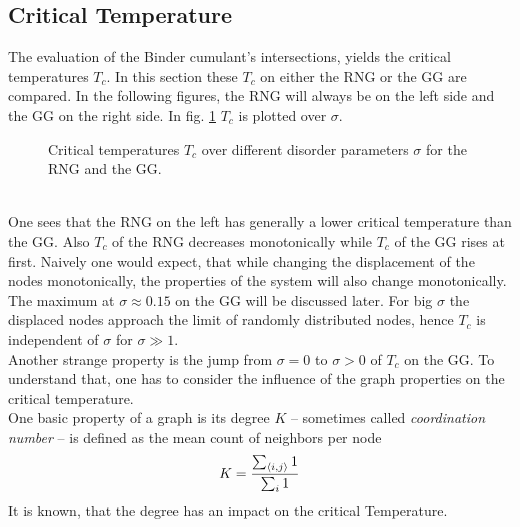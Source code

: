 \subsection{Critical Temperature}
\label{ssec:binderIntersections}
    The evaluation of the Binder cumulant's intersections, yields the
    critical temperatures \(T_c\).
    In this section these \(T_c\) on either the RNG or the GG are
    compared. In the following figures, the RNG will always be on the
    left side and the GG on the right side.
    In fig. \ref{fig:Tc} \(T_c\) is plotted over \(\sigma\).
    \begin{figure}[htbp]
        \centering
        \caption[Critical Temperature over different disorder parameters]
        {
            Critical temperatures \(T_c\) over different
            disorder parameters \(\sigma\) for
             the RNG and
             the GG.\\
        }
        \label{fig:Tc}
    \end{figure}\\
    One sees that the RNG on the left has generally a lower critical
    temperature than the GG. Also \(T_c\) of the RNG decreases
    monotonically while \(T_c\) of the GG rises at first. Naively one would
    expect, that while changing the displacement of the nodes monotonically,
    the properties of the system will also change monotonically. The
    maximum at \(\sigma \approx 0.15\) on the GG will be discussed later.
    For big \(\sigma\) the displaced nodes approach the limit of randomly
    distributed nodes, hence \(T_c\) is independent of \(\sigma\) for
    \(\sigma \gg 1\).\\
    Another strange property is the jump from \(\sigma = 0\) to \(\sigma > 0\)
    of \(T_c\) on the GG. To understand that, one has to
    consider the influence of the graph properties on the critical
    temperature.\\
    One basic property of a graph is its degree \(K\) -- sometimes
    called \emph{coordination number} -- is defined as the mean count of
    neighbors per node
    \begin{equation}
        K = \frac{\sum_{\left< i,j \right>} 1}{\sum_{i} 1}
        \label{eq:degree}
    \end{equation}
    It is known, that the degree has an impact on the critical Temperature.
